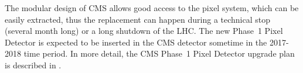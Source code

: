 The modular design of CMS allows good access to the pixel system,
which can be easily extracted, thus the replacement can happen during
a technical stop (several month long) or a long shutdown of the LHC.
The new Phase~1 Pixel Detector is expected to be inserted in the CMS
detector sometime in the 2017-2018 time period. In more detail, the
CMS Phase~1 Pixel Detector upgrade plan is described in
\cite{UpgradeProposal}.

